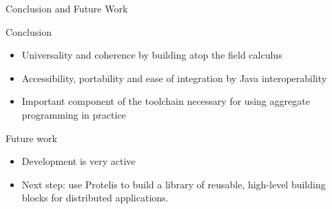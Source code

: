 \documentclass[presentation]{beamer} %
\begin{document}
\begin{frame}{Conclusion and Future Work}
  \begin{block} {Conclusion}
   \begin{itemize}
    \item Universality and coherence by building atop the field calculus
    \item Accessibility, portability and ease of integration by Java interoperability
    \item Important component of the toolchain necessary for using aggregate programming in practice
   \end{itemize}
  \end{block}
  \begin{block} {Future work}
   \begin{itemize}
    \item Development is very active
    \item Next step: use Protelis to build a library of reusable, high-level building blocks for distributed applications.
   \end{itemize}
  \end{block}
\end{frame}





\section*{\refname}
\begin{frame}[allowframebreaks]
  \frametitle{\refname}
  \scriptsize
  
  
\end{frame}
\section*{\refname}

\end{document}
